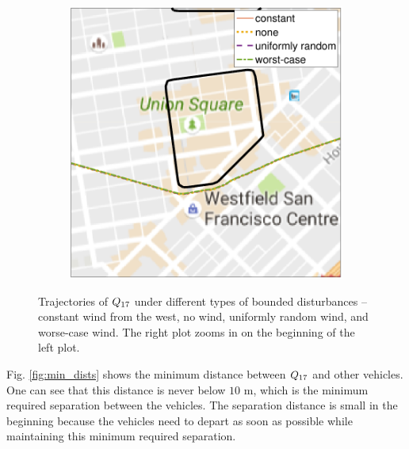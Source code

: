 \begin{figure}[!htb]
\begin{subfigure}{0.5\textwidth}
    \includegraphics[width=\columnwidth]{figs/dstb_trajs_zoomed_in}
    \subcaption{}
    \label{fig:dstb_trajs_s2}
  \end{subfigure}%

  \caption{Trajectories of $Q_{17}$ under different types of bounded disturbances -- constant wind from the west, no wind, uniformly random wind, and worse-case wind. The right plot zooms in on the beginning of the left plot.}
  \label{fig:dstb_trajs}
\end{figure}

Fig. \ref{fig:min_dists} shows the minimum distance between $Q_{17}$ and other vehicles. One can see that this distance is never below $10$ m, which is the minimum required separation between the vehicles. The separation distance is small in the beginning because the vehicles need to depart as soon as possible while maintaining this minimum required separation. 

